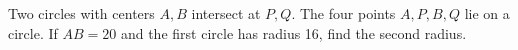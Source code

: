 Two circles with centers $A,B$ intersect at $P,Q$. The four points $A,P,B,Q$ lie on a circle. If $AB=20$ and the first circle has radius 16, find the second radius.
